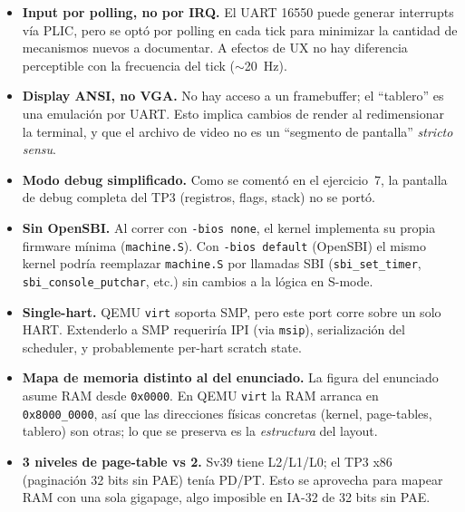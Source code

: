 \begin{itemize}
  \item \textbf{Input por polling, no por IRQ.} El UART 16550 puede generar interrupts vía PLIC, pero se optó por
  polling en cada tick para minimizar la cantidad de mecanismos nuevos a documentar. A efectos de UX no hay diferencia
  perceptible con la frecuencia del tick (${\sim}$20~Hz).
  \item \textbf{Display ANSI, no VGA.} No hay acceso a un framebuffer; el ``tablero'' es una emulación por UART. Esto
  implica cambios de render al redimensionar la terminal, y que el archivo de video no es un ``segmento de pantalla''
  \emph{stricto sensu}.
  \item \textbf{Modo debug simplificado.} Como se comentó en el ejercicio~7, la pantalla de debug completa del TP3
  (registros, flags, stack) no se portó.
  \item \textbf{Sin OpenSBI.} Al correr con \texttt{-bios none}, el kernel implementa su propia firmware mínima
  (\texttt{machine.S}). Con \texttt{-bios default} (OpenSBI) el mismo kernel podría reemplazar \texttt{machine.S} por
  llamadas SBI (\texttt{sbi\_set\_timer}, \texttt{sbi\_console\_putchar}, etc.) sin cambios a la lógica en S-mode.
  \item \textbf{Single-hart.} QEMU \texttt{virt} soporta SMP, pero este port corre sobre un solo HART. Extenderlo a SMP
  requeriría IPI (via \texttt{msip}), serialización del scheduler, y probablemente per-hart scratch state.
  \item \textbf{Mapa de memoria distinto al del enunciado.} La figura del enunciado asume RAM desde \texttt{0x0000}. En
  QEMU \texttt{virt} la RAM arranca en \texttt{0x8000\_0000}, así que las direcciones físicas concretas (kernel,
  page-tables, tablero) son otras; lo que se preserva es la \emph{estructura} del layout.
  \item \textbf{3 niveles de page-table vs 2.} Sv39 tiene L2/L1/L0; el TP3 x86 (paginación 32 bits sin PAE) tenía PD/PT.
  Esto se aprovecha para mapear RAM con una sola gigapage, algo imposible en IA-32 de 32 bits sin PAE.
\end{itemize}
